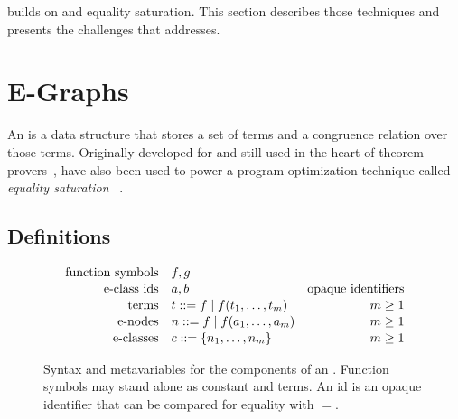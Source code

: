 \egg builds on \egraphs and equality saturation.
  This section describes those techniques and
  presents the challenges that \egg addresses.



\section{E-Graphs}
\label{sec:egraphs}

An \textit{\egraph} is a data structure that stores a set of terms and a
  congruence relation over those terms.
Originally developed for and still used in the
  heart of theorem provers~\cite{nelson, simplify, z3},
  \egraphs have also been used to power a program optimization technique
  called \textit{equality saturation}~%
  \cite{denali, eqsat, eqsat-llvm, szalinski, yogo-pldi20, spores, herbie}.

\subsection{Definitions}

\begin{figure}
  \centering
  \begin{align*}
     \text{function symbols} \quad & f,g                                   \\[-0.2em]
     \text{\eclass ids} \quad & a,b & \text{opaque identifiers}            \\[-0.2em]
     \text{terms}     \quad & t  ::= f \mid f(t_1, \ldots, t_m) & m \geq 1 \\[-0.2em]
     \text{\enodes}   \quad & n  ::= f \mid f(a_1, \ldots, a_m) & m \geq 1 \\[-0.2em]
     \text{\eclasses} \quad & c  ::= \{ n_1, \ldots, n_m \}     & m \geq 1
  \end{align*}
  \caption{
    Syntax and metavariables for the components of an \egraph.
    Function symbols may stand alone as constant \enodes and terms.
    An \eclass id is an opaque identifier that can be compared for equality with $=$.
  }
  \label{fig:syntax}
\end{figure}

